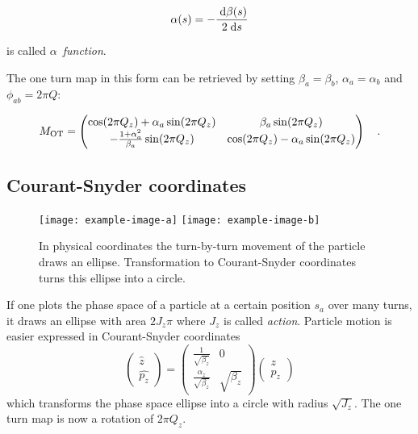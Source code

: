 \begin{equation}
    \alpha(s) = -\frac{\;\text{d} \beta(s)}{2 \;\text{d} s}
    \label{eq_alpha}
\end{equation}

is called $\alpha$~\emph{function}.


The one turn map in this form can be retrieved by setting $\beta_a = \beta_b $, $\alpha_a = \alpha_b$
and $\phi_{ab} = 2\pi Q$:

\begin{equation}
    M_\text{OT} = \begin{pmatrix}
        \cos(2\pi Q_z) + \alpha_a \sin(2\pi Q_z) & \beta_a\sin(2\pi Q_z) \\
        -\frac{1+\alpha_a^2}{\beta_a}\sin(2\pi Q_z) & \cos(2\pi Q_z) - \alpha_a\sin(2\pi Q_z)
    \end{pmatrix}
    \quad .
\end{equation}

\subsection{Courant-Snyder coordinates}

\begin{figure}[h]
    \centering
    \texttt{[image: example-image-a]}
    \hspace{1em}
    \texttt{[image: example-image-b]}
    \caption{In physical coordinates the turn-by-turn movement of the particle draws an ellipse.
        Transformation to Courant-Snyder
        coordinates turns this ellipse into a circle.}
    \label{fig_phase_space_ellipse}
\end{figure}

If one plots the phase space of a particle at a certain position $s_a$ over many turns, it draws an
ellipse with area $2J_z\pi$ where $J_z$ is called \emph{action}.
Particle motion is easier expressed in Courant-Snyder coordinates
\begin{equation}
    \begin{pmatrix}
        \hat{z}\\
        \hat{p_z}
    \end{pmatrix}
    =
    \begin{pmatrix}
        \frac{1}{\sqrt{\beta_z}} & 0\\
        \frac{\alpha_z}{\sqrt{\beta_z}} & \sqrt{\beta_z}
    \end{pmatrix}
    \begin{pmatrix}
        z\\
        p_z
    \end{pmatrix}
\end{equation}
which transforms the phase space ellipse into a circle with radius $\sqrt{J_z}$.
The one turn map is now a rotation of $2\pi Q_z$. 

